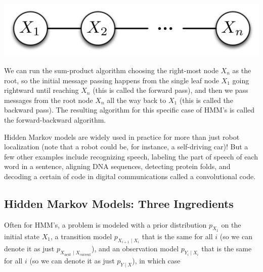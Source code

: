 \documentclass[6008notes.tex]{subfiles}
\begin{document}
{ \par}

{\centering\includegraphics[scale=0.4]{images_sec-graphical-models-markov-chain} \par}

We can run the sum-product algorithm choosing the right-most node $X_n$ as the root, so the initial message passing happens from the single leaf node $X_1$ going rightward until reaching $X_n$ (this is called the forward pass), and then we pass messages from the root node $X_n$ all the way back to $X_1$ (this is called the backward pass). The resulting algorithm for this specific case of HMM's is called the forward-backward algorithm.

Hidden Markov models are widely used in practice for more than just robot localization (note that a robot could be, for instance, a self-driving car)! But a few other examples include recognizing speech, labeling the part of speech of each word in a sentence, aligning DNA sequences, detecting protein folds, and decoding a certain of code in digital communications called a convolutional code.


\subsection{Hidden Markov Models: Three Ingredients}

Often for HMM's, a problem is modeled with a prior distribution $p_{X_1}$ on the initial state $X_1$, a transition model $p_{X_{i+1}\mid X_{i}}$ that is the same for all $i$ (so we can denote it as just $p_{X_{\text {next}}\mid X_{\text {current}}}$), and an observation model $p_{Y_{i}\mid X_{i}}$ that is the same for all $i$ (so we can denote it as just $p_{Y\mid X}$), in which case
\end{document}
